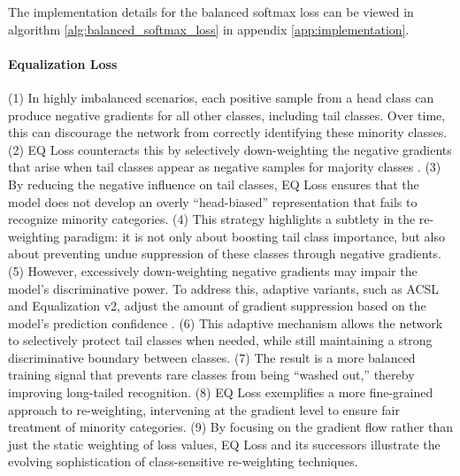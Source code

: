 The implementation details for the balanced softmax loss can be viewed in algorithm \ref{alg:balanced_softmax_loss} in appendix \ref{app:implementation}.

\paragraph{Equalization Loss}
(1) In highly imbalanced scenarios, each positive sample from a head class can produce negative gradients for all other classes, including tail classes. Over time, this can discourage the network from correctly identifying these minority classes.
(2) EQ Loss counteracts this by selectively down-weighting the negative gradients that arise when tail classes appear as negative samples for majority classes \cite{zhang2023deep}.
(3) By reducing the negative influence on tail classes, EQ Loss ensures that the model does not develop an overly “head-biased” representation that fails to recognize minority categories.
(4) This strategy highlights a subtlety in the re-weighting paradigm: it is not only about boosting tail class importance, but also about preventing undue suppression of these classes through negative gradients.
(5) However, excessively down-weighting negative gradients may impair the model’s discriminative power. To address this, adaptive variants, such as ACSL and Equalization v2, adjust the amount of gradient suppression based on the model’s prediction confidence \cite{tan2020equalizationlosslongtailedobject, zhang2023deep}.
(6) This adaptive mechanism allows the network to selectively protect tail classes when needed, while still maintaining a strong discriminative boundary between classes.
(7) The result is a more balanced training signal that prevents rare classes from being “washed out,” thereby improving long-tailed recognition.
(8) EQ Loss exemplifies a more fine-grained approach to re-weighting, intervening at the gradient level to ensure fair treatment of minority categories.
(9) By focusing on the gradient flow rather than just the static weighting of loss values, EQ Loss and its successors illustrate the evolving sophistication of class-sensitive re-weighting techniques.

